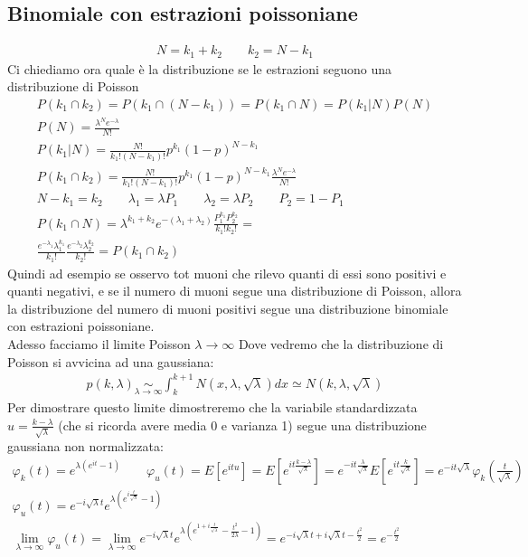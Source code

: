 \documentclass[a4paper, oneside]{article}
\begin{document}
\subsection{Binomiale con estrazioni poissoniane}
\begin{gather*}
    N = k_1 + k_2 \qquad k_2 = N - k_1
\end{gather*}
Ci chiediamo ora quale è la distribuzione se le estrazioni seguono una distribuzione di Poisson
\begin{gather*}
    P(k_1 \cap k_2) = P(k_1 \cap (N - k_1)) = P(k_1 \cap N) = P(k_1 | N) P(N)\\
    P(N) = \frac{\lambda^N e^{-\lambda}}{N!} \\
    P(k_1 | N) = \frac{N!}{k_1!(N-k_1)!} p^{k_1} (1-p)^{N-k_1} \\
    P(k_1 \cap k_2) = \frac{N!}{k_1!(N-k_1)!} p^{k_1} (1-p)^{N-k_1} \frac{\lambda^N e^{-\lambda}}{N!} \\
    N - k_1 = k_2 \qquad \lambda_1 = \lambda P_1 \qquad \lambda_2 = \lambda P_2 \qquad P_2 = 1 - P_1\\
    P(k_1 \cap N) = \lambda^{k_1 + k_2} e^{-(\lambda_1 + \lambda_2)} \frac{P_1^{k_1} P_2^{k_2}}{k_1! k_2!} =\\
     \frac{e^{-\lambda_1} \lambda_1^{k_1}}{k_1!} \frac{e^{-\lambda_2} \lambda_2^{k_2}}{k_2!} = P(k_1 \cap k_2)
\end{gather*}
Quindi ad esempio se osservo tot muoni che rilevo quanti di essi sono positivi e quanti negativi, e se il numero di muoni segue una distribuzione di Poisson, allora la distribuzione del numero di muoni positivi segue una distribuzione binomiale con estrazioni poissoniane.\\
Adesso facciamo il limite Poisson $\lambda \to \infty$ Dove vedremo che la distribuzione di Poisson si avvicina ad una gaussiana:
\begin{gather*}
    p(k, \lambda) \underset{\lambda \to \infty}{\sim} \int_k^{k+1} N(x, \lambda, \sqrt{\lambda}) dx \simeq N (k, \lambda, \sqrt{\lambda})
\end{gather*}
Per dimostrare questo limite dimostreremo che la variabile standardizzata $u = \frac{k - \lambda}{\sqrt{\lambda}}$ (che si ricorda avere media 0 e varianza 1) segue una distribuzione gaussiana non normalizzata:
\begin{gather*}
    \varphi_k(t) = e^{\lambda (e^{it}-1)} \qquad \varphi_u(t) = E[e^{itu}] = E[e^{it \frac{k - \lambda}{\sqrt{\lambda}}}] = e^{-it \frac{\lambda}{\sqrt{\lambda}}} E[e^{it \frac{k}{\sqrt{\lambda}}}] = e^{-it \sqrt{\lambda}} \varphi_k(\frac{t}{\sqrt{\lambda}})\\
    \varphi_u(t) = e^{-i \sqrt{\lambda} t} e^{\lambda (e^{i \frac{t}{\sqrt{\lambda}}}-1)}\\
    \lim_{\lambda \to \infty} \varphi_u(t) = \lim_{\lambda \to \infty} e^{-i \sqrt{\lambda} t} e^{\lambda (e^{1 + i \frac{t}{\sqrt{\lambda}}}-\frac{t^2}{2\lambda}-1 )} = e^{-i\sqrt{\lambda}t + i\sqrt{\lambda}t - \frac{t^2}{2}} = e^{-\frac{t^2}{2}}
\end{gather*}
\end{document}
